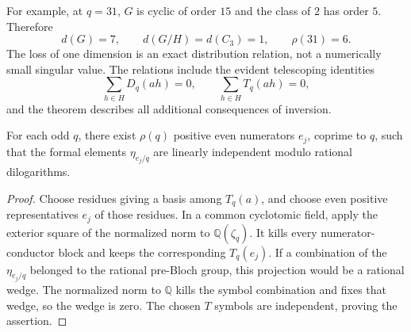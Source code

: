 
For example, at $q=31$, $G$ is cyclic of order $15$ and the class
of $2$ has order $5$. Therefore
\[
 d(G)=7,\qquad d(G/H)=d(C_3)=1,\qquad\rho(31)=6.
\]
The loss of one dimension is an exact distribution relation, not a
numerically small singular value. The relations include the evident
telescoping identities
\[
 \sum_{h\in H}D_q(ah)=0,\qquad
 \sum_{h\in H}T_q(ah)=0,
\]
and the theorem describes all additional consequences of inversion.

\begin{corollary}
\label{jnew:cor:value-rank}
For each odd $q$, there exist $\rho(q)$ positive even numerators
$e_j$, coprime to $q$, such that the formal elements
$\eta_{e_j/q}$ are linearly independent modulo rational
dilogarithms.
\end{corollary}
\begin{proof}
Choose residues giving a basis among $T_q(a)$, and choose even
positive representatives $e_j$ of those residues. In a common
cyclotomic field, apply the exterior square of the normalized norm
to $\mathbb Q(\zeta_q)$. It kills every numerator-conductor block
and keeps the corresponding $T_q(e_j)$. If a combination of the
$\eta_{e_j/q}$ belonged to the rational pre-Bloch group, this
projection would be a rational wedge. The normalized norm to
$\mathbb Q$ kills the symbol combination and fixes that wedge, so
the wedge is zero. The chosen $T$ symbols are independent, proving
the assertion.
\end{proof}

